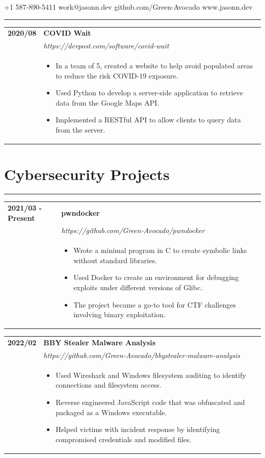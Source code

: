 \documentclass[letterpaper]{article}
\makeatletter
\newcommand{\sectcolor}{cyan}
\newcommand{\sect}[1]{\section*{#1}
                        {\color{\sectcolor}
                        \rule{\textwidth}{1pt}
                        \vspace{-1ex}}}
\newcommand{\secondpage}{\pagebreak
                            {\small
                                +1 587-890-5411
                                \hfill
                                work@jasonn.dev
                                \hfill
                                github.com/Green-Avocado
                                \hfill
                                www.jasonn.dev
                            }
                            \vspace{-4pt}

                            \rule{\textwidth}{0.1pt}

                            \vspace{0.2in}}
\makeatother
\begin{document}
    \secondpage

        \begin{tabular}{p{} p{}}
            \textbf{2020/08} & \textbf{COVID Wait} \\
            & \emph{https://devpost.com/software/covid-wait} \\
            & \begin{itemize}
                \item In a team of 5, created a website to help avoid populated areas to reduce the risk
                    COVID-19 exposure.
                \item Used Python to develop a server-side application to retrieve data from the Google
                    Maps API.
                \item Implemented a RESTful API to allow clients to query data from the server.
            \end{itemize}
        \end{tabular}

    \sect{Cybersecurity Projects}

        \begin{tabular}{p{} p{}}
            \textbf{2021/03 - Present} & \textbf{pwndocker} \\
            & \emph{https://github.com/Green-Avocado/pwndocker} \\
            & \begin{itemize}
                \item Wrote a minimal program in C to create symbolic links without standard libraries.
                \item Used Docker to create an environment for debugging exploits under different
                    versions of Glibc.
                \item The project became a go-to tool for CTF challenges involving binary exploitation.
            \end{itemize}
        \end{tabular}

        \begin{tabular}{p{} p{}}
            \textbf{2022/02} & \textbf{BBY Stealer Malware Analysis} \\
            & \emph{https://github.com/Green-Avocado/bbystealer-malware-analysis} \\
            & \begin{itemize}
                \item Used Wireshark and Windows filesystem auditing to identify connections and
                    filesystem access.
                \item Reverse engineered JavaScript code that was obfuscated and packaged as a Windows
                    executable.
                \item Helped victims with incident response by identifying compromised credentials and
                    modified files.
            \end{itemize}
        \end{tabular}
\end{document}
